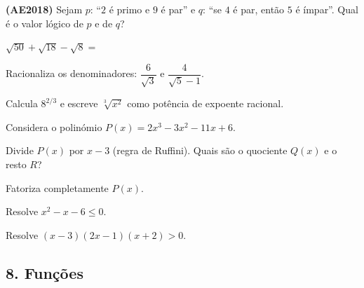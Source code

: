 \documentclass[12pt,a4paper]{article}
\begin{document}
\begin{questoes}[resume]
    \item \label{primeiraII} \textbf{(AE2018)} Sejam
    $p$: ``$2$ é primo e $9$ é par'' e
    $q$: ``se $4$ é par, então $5$ é ímpar''.
    Qual é o valor lógico de $p$ e de $q$?

    \item $\sqrt{50} + \sqrt{18} - \sqrt{8} =$

    \item Racionaliza os denominadores:
    $\dfrac{6}{\sqrt{3}}$ e $\dfrac{4}{\sqrt{5} - 1}$.

    \item Calcula $8^{2/3}$ e escreve
    $\sqrt[3]{x^2}$ como potência de expoente racional.

    \item[] Considera o polinómio
    $P(x) = 2x^3 - 3x^2 - 11x + 6$.

    \item Divide $P(x)$ por $x - 3$ (regra de Ruffini).
    Quais são o quociente $Q(x)$ e o resto $R$?

    \item Fatoriza completamente $P(x)$.

    \item Resolve $x^2 - x - 6 \leq 0$.
    \op[2]{c}{$]-\infty,\, -2] \cup [3,\, +\infty[$}{$]-2,\, 3[$}{$[-2,\, 3]$}{$[-3,\, 2]$}

    \item Resolve $(x - 3)(2x - 1)(x + 2) > 0$.
    \op[2]{d}{$]-\infty,\, -2[ \,\cup\, \left]\dfrac{1}{2},\, 3\right[$}{$]3,\, +\infty[$}{$\left[-2,\, \dfrac{1}{2}\right] \cup [3,\, +\infty[$}{$\left]-2,\, \dfrac{1}{2}\right[ \cup\, ]3,\, +\infty[$}
\end{questoes}

\subsection*{8. Funções}
\end{document}
